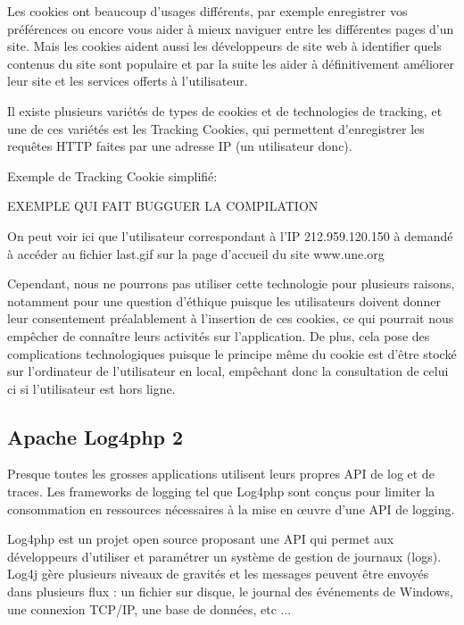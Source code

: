             Les cookies ont beaucoup d'usages différents, par exemple enregistrer vos préférences ou encore vous aider à mieux naviguer entre les différentes pages d'un site. Mais les cookies aident aussi les développeurs de site web à identifier quels contenus du site sont populaire et par la suite les aider à définitivement améliorer leur site et les services offerts à l'utilisateur.
            
            Il existe plusieurs variétés de types de cookies et de technologies de tracking, et une de ces variétés est les Tracking Cookies, qui permettent d'enregistrer les requêtes HTTP faites par une adresse IP (un utilisateur donc). 
            
            Exemple de Tracking Cookie simplifié: 

EXEMPLE QUI FAIT BUGGUER LA COMPILATION
			
            
            
            
            On peut voir ici que l'utilisateur correspondant à l'IP 212.959.120.150 à demandé à accéder au fichier last.gif sur la page d'accueil du site www.une.org
            
            Cependant, nous ne pourrons pas utiliser cette technologie pour plusieurs raisons, notamment pour une question d'éthique puisque les utilisateurs doivent donner leur consentement préalablement à l'insertion de ces cookies, ce qui pourrait nous empêcher de connaître leurs activités sur l'application. De plus, cela pose des complications technologiques puisque le principe même du cookie est d'être stocké sur l'ordinateur de l'utilisateur en local, empêchant donc la consultation de celui ci si l'utilisateur est hors ligne.
        
        \subsection{Apache Log4php 2}
        
        
            Presque toutes les grosses applications utilisent leurs propres API de log et de traces. Les frameworks de logging tel que Log4php sont conçus pour limiter la consommation en ressources nécessaires à la mise en œuvre d'une API de logging.
            
            Log4php est un projet open source proposant une API qui permet aux développeurs d'utiliser et paramétrer un système de gestion de journaux (logs). Log4j gère plusieurs niveaux de gravités et les messages peuvent être envoyés dans plusieurs flux : un fichier sur disque, le journal des événements de Windows, une connexion TCP/IP, une base de données, etc ...
        
